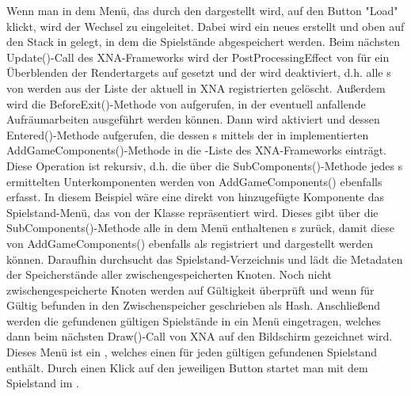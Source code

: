 Wenn man in dem Menü, das durch den  dargestellt wird, auf den Button "Load" klickt, wird der Wechsel zu  eingeleitet. Dabei wird ein neues  erstellt und oben auf den Stack in  gelegt, in dem die Spielstände abgespeichert werden.
\newline
\newline
Beim nächsten Update()-Call des XNA-Frameworks wird der PostProcessingEffect von  für ein Überblenden der Rendertargets auf  gesetzt und der  wird deaktiviert, d.h. alle s von  werden aus der Liste der aktuell in XNA registrierten  gelöscht. Außerdem wird die BeforeExit()-Methode von  aufgerufen, in der eventuell anfallende Aufräumarbeiten ausgeführt werden können.
\newline
\newline
Dann wird  aktiviert und dessen Entered()-Methode aufgerufen, die dessen s mittels der in  implementierten AddGameComponents()-Methode in die -Liste des XNA-Frameworks einträgt. Diese Operation ist rekursiv, d.h. die über die SubComponents()-Methode jedes s ermittelten Unterkomponenten werden von AddGameComponents() ebenfalls erfasst.
\newline
\newline
In diesem Beispiel wäre eine direkt von  hinzugefügte Komponente das Spielstand-Menü, das von der Klasse  repräsentiert wird. Dieses gibt über die SubComponents()-Methode alle in dem Menü enthaltenen s zurück, damit diese von AddGameComponents() ebenfalls als  registriert und dargestellt werden können.
\newline
\newline
Daraufhin durchsucht  das Spielstand-Verzeichnis und lädt die Metadaten der Speicherstände aller zwischengespeicherten Knoten.
Noch nicht zwischengespeicherte Knoten werden auf Gültigkeit überprüft und wenn für Gültig befunden in den Zwischenspeicher geschrieben als Hash.
\newline
\newline
Anschließend werden die gefundenen gültigen Spielstände in ein Menü eingetragen, welches dann beim nächsten Draw()-Call von XNA auf den Bildschirm gezeichnet wird.
Dieses Menü ist ein , welches einen  für jeden gültigen gefundenen Spielstand enthält. Durch einen Klick auf den jeweiligen Button startet man mit dem Spielstand im .

